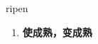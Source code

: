 
\begin{frame}
{\huge ripen}
\begin{center}
\begin{enumerate}\Large
  \item \textbf{使成熟，变成熟}
\end{enumerate}
\end{center}
\end{frame}
